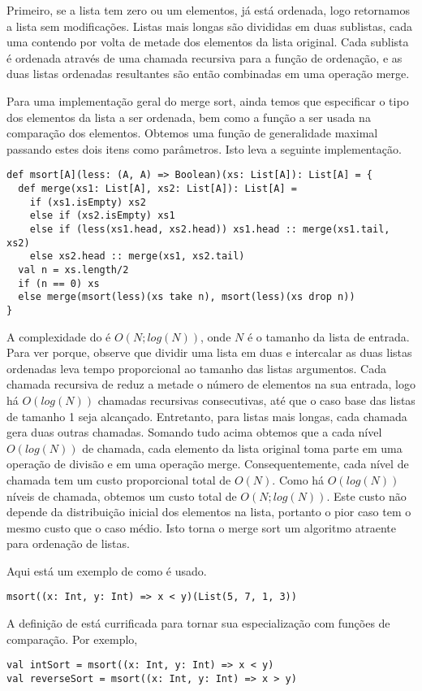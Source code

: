 Primeiro, se a lista tem zero ou um elementos, já está ordenada, logo retornamos a lista sem 
modificações. Listas mais longas são divididas em duas sublistas, cada uma contendo por volta
de metade dos elementos da lista original. Cada sublista é ordenada através de uma chamada 
recursiva para a função de ordenação, e as duas listas ordenadas resultantes são então 
combinadas em uma operação merge. 

Para uma implementação geral do merge sort, ainda temos que especificar o tipo dos elementos da lista 
a ser ordenada, bem como a função a ser usada na comparação dos elementos. Obtemos uma função de 
generalidade maximal passando estes dois itens como parâmetros. Isto leva a seguinte implementação.
\begin{lstlisting}
def msort[A](less: (A, A) => Boolean)(xs: List[A]): List[A] = {
  def merge(xs1: List[A], xs2: List[A]): List[A] =
    if (xs1.isEmpty) xs2
    else if (xs2.isEmpty) xs1
    else if (less(xs1.head, xs2.head)) xs1.head :: merge(xs1.tail, xs2)
    else xs2.head :: merge(xs1, xs2.tail)
  val n = xs.length/2
  if (n == 0) xs
  else merge(msort(less)(xs take n), msort(less)(xs drop n))
}
\end{lstlisting}

A complexidade do  é $O(N;log(N))$, onde $N$ é o tamanho da lista de entrada.
Para ver porque, observe que dividir uma lista em duas e intercalar as duas listas 
ordenadas leva tempo proporcional ao tamanho das listas argumentos. Cada chamada recursiva 
de  reduz a metade o número de elementos na sua entrada, logo há $O(log(N))$
chamadas recursivas consecutivas, até que o caso base das listas de tamanho 1 seja 
alcançado. Entretanto, para listas mais longas, cada chamada gera duas outras chamadas. 
Somando tudo acima obtemos que a cada nível $O(log(N))$ de chamada, cada elemento da lista 
original toma parte em uma operação de divisão e em uma operação merge. Consequentemente, cada 
nível de chamada tem um custo proporcional total de $O(N)$. Como há $O(log(N))$ níveis de
chamada, obtemos um custo total de $O(N;log(N))$. Este custo não depende da distribuição 
inicial dos elementos na lista, portanto o pior caso tem o mesmo custo que o caso médio.
Isto torna o merge sort um algoritmo atraente para ordenação de listas. 

Aqui está um exemplo de como  é usado.
\begin{lstlisting}
msort((x: Int, y: Int) => x < y)(List(5, 7, 1, 3))
\end{lstlisting}
A definição de  está currificada para tornar sua especialização com funções de  
comparação. Por exemplo,
\begin{lstlisting}
val intSort = msort((x: Int, y: Int) => x < y)
val reverseSort = msort((x: Int, y: Int) => x > y)
\end{lstlisting}


